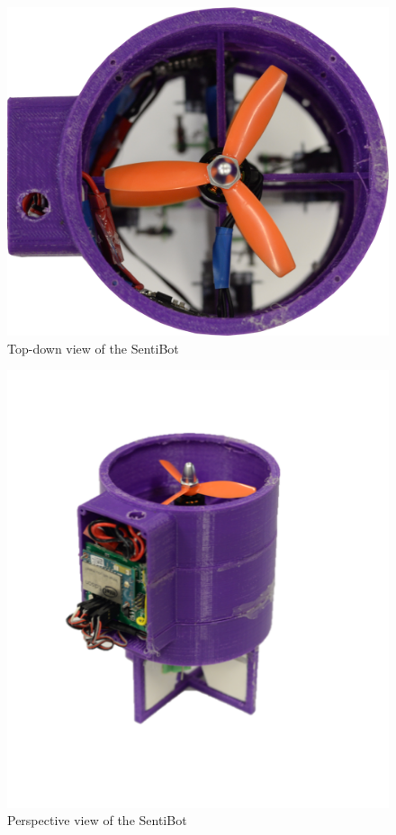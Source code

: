 \documentclass[12pt]{article}
\begin{document}
\begin{figure}
	\includegraphics[width=\linewidth]{sb-topdown.png}
	\caption{Top-down view of the SentiBot}
	\label{fig:sb-topdown}
\end{figure}

\begin{figure}
	\includegraphics[width=\linewidth]{sb-side.png}
	\caption{Perspective view of the SentiBot}
	\label{fig:sb-side}
\end{figure}
\end{document}
